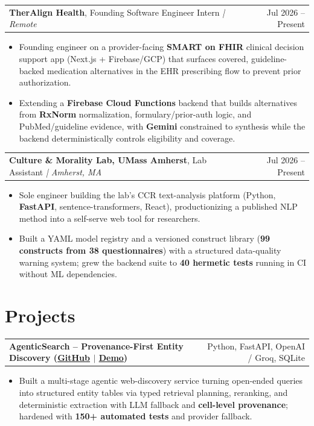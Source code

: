 \documentclass[letterpaper,11pt]{article}
\makeatletter
\newcommand{\expItem}[4]{%
  \vspace{2pt}
  \begin{tabular*}{\textwidth}{@{}l@{\extracolsep{\fill}}r@{}}
    \textbf{#1}, #2 \textit{| #3} & #4 \\
  \end{tabular*}\par\vspace{-3pt}
}
\newcommand{\projItem}[2]{%
  \vspace{2pt}
  \begin{tabular*}{\textwidth}{@{}l@{\extracolsep{\fill}}r@{}}
    \textbf{#1} & #2 \\
  \end{tabular*}\par\vspace{-3pt}
}
\makeatother
\begin{document}
\expItem{TherAlign Health}{Founding Software Engineer Intern}{Remote}{Jul 2026 -- Present}
\begin{itemize}
  \item Founding engineer on a provider-facing \textbf{SMART on FHIR} clinical decision support app (Next.js + Firebase/GCP) that surfaces covered, guideline-backed medication alternatives in the EHR prescribing flow to prevent prior authorization.
  \item Extending a \textbf{Firebase Cloud Functions} backend that builds alternatives from \textbf{RxNorm} normalization, formulary/prior-auth logic, and PubMed/guideline evidence, with \textbf{Gemini} constrained to synthesis while the backend deterministically controls eligibility and coverage.
\end{itemize}

\expItem{Culture \& Morality Lab, UMass Amherst}{Lab Assistant}{Amherst, MA}{Jul 2026 -- Present}
\begin{itemize}
  \item Sole engineer building the lab's CCR text-analysis platform (Python, \textbf{FastAPI}, sentence-transformers, React), productionizing a published NLP method into a self-serve web tool for researchers.
  \item Built a YAML model registry and a versioned construct library (\textbf{99 constructs from 38 questionnaires}) with a structured data-quality warning system; grew the backend suite to \textbf{40 hermetic tests} running in CI without ML dependencies.
\end{itemize}

\section{Projects}

\projItem{AgenticSearch -- Provenance-First Entity Discovery {\normalfont\small(\href{https://github.com/Deva-1903/ciir_agentic_search}{GitHub} $\vert$ \href{https://agentic-search-negglszkwa-uc.a.run.app}{Demo})}}{Python, FastAPI, OpenAI / Groq, SQLite}
\begin{itemize}
  \item Built a multi-stage agentic web-discovery service turning open-ended queries into structured entity tables via typed retrieval planning, reranking, and deterministic extraction with LLM fallback and \textbf{cell-level provenance}; hardened with \textbf{150+ automated tests} and provider fallback.
\end{itemize}
\end{document}
